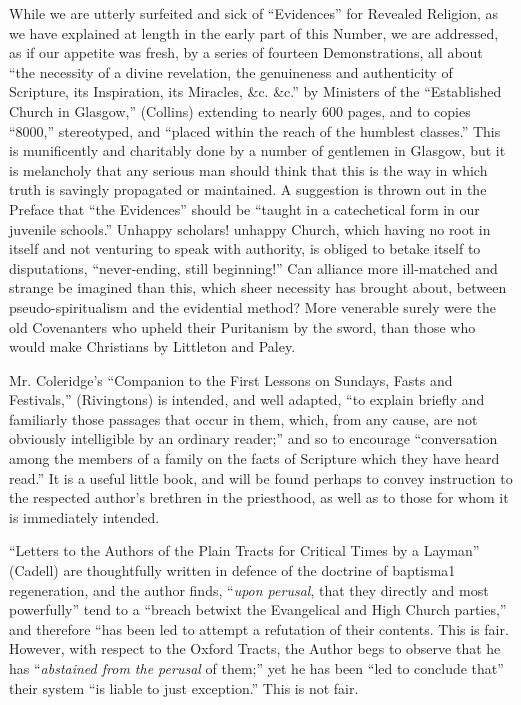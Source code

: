 While we are utterly surfeited and sick of ``Evidences''
for Revealed Religion, as we have explained at length in the early part
of this Number, we are addressed, as if our appetite was fresh, by a
series of fourteen Demonstrations, all about ``the necessity of a divine
revelation, the genuineness and authenticity of Scripture, its
Inspiration, its Miracles, \&c. \&c.'' by Ministers of the ``Established
Church in Glasgow,'' (Collins) extending to nearly 600 pages, and to
copies ``8000,'' stereotyped, and ``placed within the reach of the humblest
classes.'' This is munificently and charitably done by a number of
gentlemen in Glasgow, but it is melancholy that any serious man should
think that this is the way in which truth is savingly propagated or
maintained. A suggestion is thrown out in the Preface that ``the
Evidences'' should be ``taught in a catechetical form in our juvenile
schools.'' Unhappy scholars! unhappy Church, which having no root in
itself and not venturing to speak with authority, is obliged to betake
itself to disputations, ``never-ending, still beginning!'' Can alliance
more ill-matched and strange be imagined than this, which sheer
necessity has brought about, between pseudo-spiritualism and the
evidential method? More venerable surely were the old Covenanters who
upheld their Puritanism by the sword, than those who would make
Christians by Littleton and Paley.

Mr. Coleridge's ``Companion to the First Lessons on
Sundays, Fasts and Festivals,'' (Rivingtons) is intended, and well
adapted, ``to explain briefly and familiarly those passages that occur in
them, which, from any cause, are not obviously intelligible by an
ordinary reader;'' and so
to encourage ``conversation among the members of a family on the facts of
Scripture which they have heard read.'' It is a useful little book, and
will be found perhaps to convey instruction to the respected author's
brethren in the priesthood, as well as to those for whom it is
immediately intended.

``Letters to the Authors of the Plain Tracts for
Critical Times by a Layman'' (Cadell) are thoughtfully written in defence
of the doctrine of baptisma1 regeneration, and the author finds, ``\emph{upon perusal}, that
they directly and most powerfully'' tend to a ``breach betwixt the
Evangelical and High Church parties,'' and therefore ``has been led to
attempt a refutation of their contents. This is fair. However,
with respect to the Oxford Tracts, the Author begs to observe that he
has ``\emph{abstained from the perusal} of them;'' yet he has been ``led to
conclude that'' their system ``is liable to just exception.'' This is
not fair.

